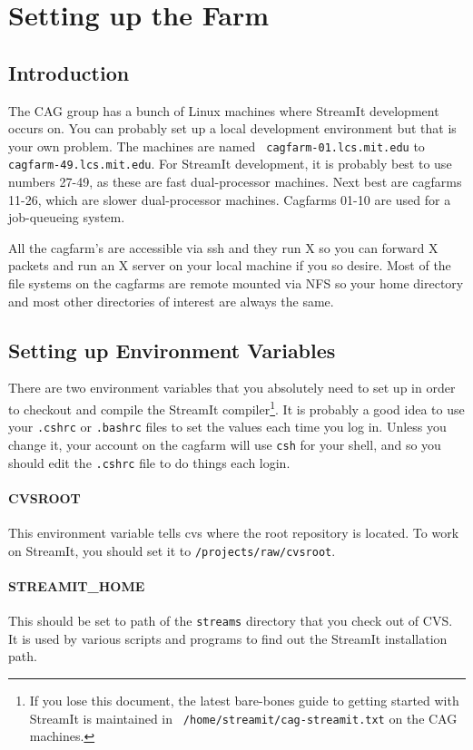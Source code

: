 \section{Setting up the Farm}

\subsection{Introduction}
The CAG group has a bunch of Linux machines where StreamIt development
occurs on. You can probably set up a local development environment but
that is your own problem. The machines are named {\tt
cagfarm-01.lcs.mit.edu} to {\tt cagfarm-49.lcs.mit.edu}. For StreamIt
development, it is probably best to use numbers 27-49, as these are
fast dual-processor machines.  Next best are cagfarms 11-26, which are
slower dual-processor machines.  Cagfarms 01-10 are used for a
job-queueing system.

All the cagfarm's are accessible via ssh and they run X so you can
forward X packets and run an X server on your local machine if you so
desire. Most of the file systems on the cagfarms are remote mounted
via NFS so your home directory and most other directories of interest
are always the same.

\subsection{Setting up Environment Variables}
There are two environment variables that you absolutely need to set up
in order to checkout and compile the StreamIt compiler\footnote{If you
  lose this document, the latest bare-bones guide to getting started
  with StreamIt is maintained in {\tt
    /home\slash{}streamit\slash{}cag-streamit.txt} on the CAG
  machines.}. It is probably a good idea to use your {\tt .cshrc} or
{\tt .bashrc} files to set the values each time you log in. Unless you
change it, your account on the cagfarm will use {\tt csh} for your
shell, and so you should edit the {\tt .cshrc} file to do things each
login.

\paragraph{CVSROOT}
This environment variable tells cvs where the root repository is 
located. To work on StreamIt, you should set it to 
{\tt /projects/raw/cvsroot}.

\paragraph{STREAMIT\_HOME}
This should be set to path of the {\tt streams} directory that 
you check out of CVS. It is used by various scripts and programs
to find out the StreamIt installation path.

